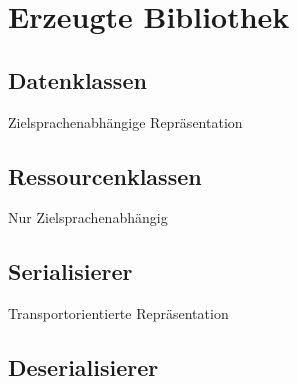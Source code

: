\section{Erzeugte Bibliothek}
\label{sec:created_library}

\subsection{Datenklassen}
\label{sec:dataclasses}

Zielsprachenabhängige Repräsentation

\subsection{Ressourcenklassen}
\label{sec:ressourceclasses}

Nur Zielsprachenabhängig

\subsection{Serialisierer}
\label{sec:serialiser}

Transportorientierte Repräsentation

\subsection{Deserialisierer}
\label{sec:deserialiser}
